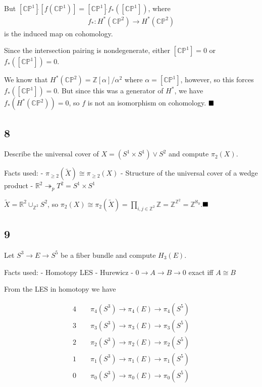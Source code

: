 But
\([{\mathbb{CP}}^1]\dot{}[f({\mathbb{CP}}^1)] = [{\mathbb{CP}}^1]\dot{} f_*([{\mathbb{CP}}^1])\),
where
\begin{align*}
f_*: H^*({\mathbb{CP}}^2) \to H^*({\mathbb{CP}}^2)
\end{align*}
is the induced map on cohomology.

Since the intersection pairing is nondegenerate, either
\([{\mathbb{CP}}^1] = 0\) or \(f_*([{\mathbb{CP}}^1]) = 0\).

We know that \(H^*({\mathbb{CP}}^2) = {\mathbb{Z}}[\alpha] / \alpha^2\)
where \(\alpha = [{\mathbb{CP}}^1]\), however, so this forces
\(f_*([{\mathbb{CP}}^1]) = 0\). But since this was a generator of
\(H^*\), we have \(f_*(H^*({\mathbb{CP}}^2)) = 0\), so \(f\) is not an
isomorphism on cohomology. \(\hfill\blacksquare\)

\hypertarget{section-12}{%
\subsection{8}\label{section-12}}

Describe the universal cover of \(X = (S^1 \times S^1) \vee S^2\) and
compute \(\pi_2(X)\).

Facts used: - \(\pi_{\geq 2}(\tilde X) \cong \pi_{\geq 2}(X)\) -
Structure of the universal cover of a wedge product -
\({\mathbb{R}}^2 \twoheadrightarrow_p T^2 = S^1 \times S^1\)

\(\tilde X = {\mathbb{R}}^2 \cup_{{\mathbb{Z}}^2} S^2\), so
\(\pi_2(X) \cong \pi_2(\tilde X) = \prod_{i,j \in {\mathbb{Z}}^2} {\mathbb{Z}}= {\mathbb{Z}}^{{\mathbb{Z}}^2} = {\mathbb{Z}}^{\aleph_0}\).\(\hfill\blacksquare\)

\hypertarget{section-13}{%
\subsection{9}\label{section-13}}

Let \(S^3 \to E \to S^5\) be a fiber bundle and compute \(H_3(E)\).

Facts used: - Homotopy LES - Hurewicz - \(0\to A\to B \to 0\) exact iff
\(A\cong B\)

From the LES in homotopy we have

\begin{align} 4\qquad \pi_4(S^3) \to \pi_4(E) \to \pi_4(S^5) \\ 3\qquad \pi_3(S^3) \to \pi_3(E) \to \pi_3(S^5) \\ 2\qquad \pi_2(S^3) \to \pi_2(E) \to \pi_2(S^5) \\ 1\qquad \pi_1(S^3) \to \pi_1(E) \to \pi_1(S^5) \\ 0\qquad \pi_0(S^3) \to \pi_0(E) \to \pi_0(S^5) \\ \end{align}


